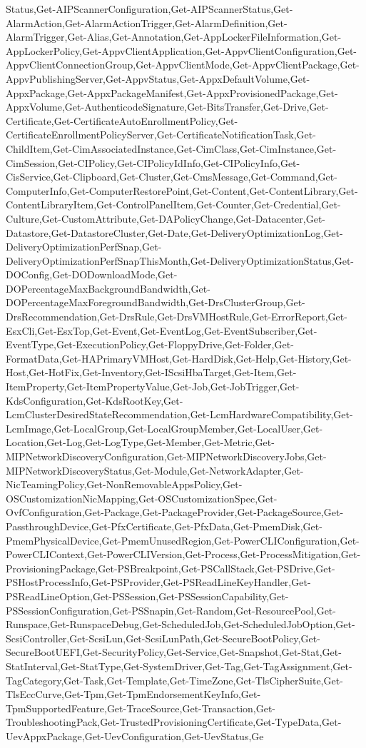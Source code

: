 {{Status,Get-AIPScannerConfiguration,Get-AIPScannerStatus,Get-AlarmAction,Get-AlarmActionTrigger,Get-AlarmDefinition,Get-AlarmTrigger,Get-Alias,Get-Annotation,Get-AppLockerFileInformation,Get-AppLockerPolicy,Get-AppvClientApplication,Get-AppvClientConfiguration,Get-AppvClientConnectionGroup,Get-AppvClientMode,Get-AppvClientPackage,Get-AppvPublishingServer,Get-AppvStatus,Get-AppxDefaultVolume,Get-AppxPackage,Get-AppxPackageManifest,Get-AppxProvisionedPackage,Get-AppxVolume,Get-AuthenticodeSignature,Get-BitsTransfer,Get-Drive,Get-Certificate,Get-CertificateAutoEnrollmentPolicy,Get-CertificateEnrollmentPolicyServer,Get-CertificateNotificationTask,Get-ChildItem,Get-CimAssociatedInstance,Get-CimClass,Get-CimInstance,Get-CimSession,Get-CIPolicy,Get-CIPolicyIdInfo,Get-CIPolicyInfo,Get-CisService,Get-Clipboard,Get-Cluster,Get-CmsMessage,Get-Command,Get-ComputerInfo,Get-ComputerRestorePoint,Get-Content,Get-ContentLibrary,Get-ContentLibraryItem,Get-ControlPanelItem,Get-Counter,Get-Credential,Get-Culture,Get-CustomAttribute,Get-DAPolicyChange,Get-Datacenter,Get-Datastore,Get-DatastoreCluster,Get-Date,Get-DeliveryOptimizationLog,Get-DeliveryOptimizationPerfSnap,Get-DeliveryOptimizationPerfSnapThisMonth,Get-DeliveryOptimizationStatus,Get-DOConfig,Get-DODownloadMode,Get-DOPercentageMaxBackgroundBandwidth,Get-DOPercentageMaxForegroundBandwidth,Get-DrsClusterGroup,Get-DrsRecommendation,Get-DrsRule,Get-DrsVMHostRule,Get-ErrorReport,Get-EsxCli,Get-EsxTop,Get-Event,Get-EventLog,Get-EventSubscriber,Get-EventType,Get-ExecutionPolicy,Get-FloppyDrive,Get-Folder,Get-FormatData,Get-HAPrimaryVMHost,Get-HardDisk,Get-Help,Get-History,Get-Host,Get-HotFix,Get-Inventory,Get-IScsiHbaTarget,Get-Item,Get-ItemProperty,Get-ItemPropertyValue,Get-Job,Get-JobTrigger,Get-KdsConfiguration,Get-KdsRootKey,Get-LcmClusterDesiredStateRecommendation,Get-LcmHardwareCompatibility,Get-LcmImage,Get-LocalGroup,Get-LocalGroupMember,Get-LocalUser,Get-Location,Get-Log,Get-LogType,Get-Member,Get-Metric,Get-MIPNetworkDiscoveryConfiguration,Get-MIPNetworkDiscoveryJobs,Get-MIPNetworkDiscoveryStatus,Get-Module,Get-NetworkAdapter,Get-NicTeamingPolicy,Get-NonRemovableAppsPolicy,Get-OSCustomizationNicMapping,Get-OSCustomizationSpec,Get-OvfConfiguration,Get-Package,Get-PackageProvider,Get-PackageSource,Get-PassthroughDevice,Get-PfxCertificate,Get-PfxData,Get-PmemDisk,Get-PmemPhysicalDevice,Get-PmemUnusedRegion,Get-PowerCLIConfiguration,Get-PowerCLIContext,Get-PowerCLIVersion,Get-Process,Get-ProcessMitigation,Get-ProvisioningPackage,Get-PSBreakpoint,Get-PSCallStack,Get-PSDrive,Get-PSHostProcessInfo,Get-PSProvider,Get-PSReadLineKeyHandler,Get-PSReadLineOption,Get-PSSession,Get-PSSessionCapability,Get-PSSessionConfiguration,Get-PSSnapin,Get-Random,Get-ResourcePool,Get-Runspace,Get-RunspaceDebug,Get-ScheduledJob,Get-ScheduledJobOption,Get-ScsiController,Get-ScsiLun,Get-ScsiLunPath,Get-SecureBootPolicy,Get-SecureBootUEFI,Get-SecurityPolicy,Get-Service,Get-Snapshot,Get-Stat,Get-StatInterval,Get-StatType,Get-SystemDriver,Get-Tag,Get-TagAssignment,Get-TagCategory,Get-Task,Get-Template,Get-TimeZone,Get-TlsCipherSuite,Get-TlsEccCurve,Get-Tpm,Get-TpmEndorsementKeyInfo,Get-TpmSupportedFeature,Get-TraceSource,Get-Transaction,Get-TroubleshootingPack,Get-TrustedProvisioningCertificate,Get-TypeData,Get-UevAppxPackage,Get-UevConfiguration,Get-UevStatus,Ge}}
